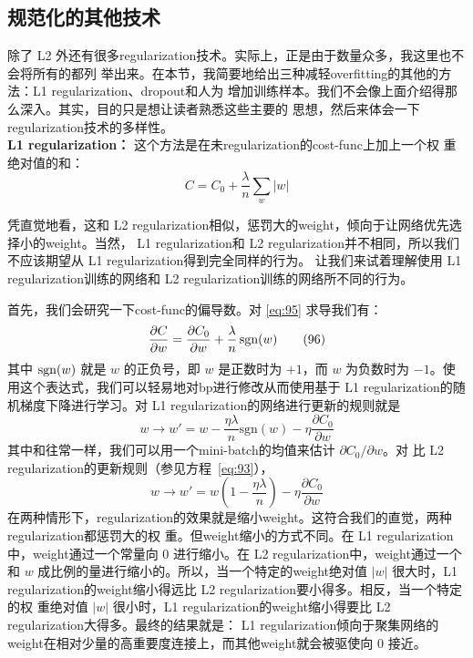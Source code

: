 \subsection{规范化的其他技术}

除了 L2 外还有很多\gls*{regularization}技术。实际上，正是由于数量众多，我这里也不会将所有的都列
举出来。在本节，我简要地给出三种减轻\gls*{overfitting}的其他的方法：L1 \gls*{regularization}、\gls*{dropout}和人为
增加训练样本。我们不会像上面介绍得那么深入。其实，目的只是想让读者熟悉这些主要的
思想，然后来体会一下\gls*{regularization}技术的多样性。\\

\textbf{L1 \gls*{regularization}：} 这个方法是在未\gls*{regularization}的\gls*{cost-func}上加上一个权
重绝对值的和：
\begin{equation}
  C = C_0 + \frac{\lambda}{n} \sum_w |w|
  \label{eq:95}\tag{95}
\end{equation}

凭直觉地看，这和 L2 \gls*{regularization}相似，惩罚大的\gls*{weight}，倾向于让网络优先选择小的\gls*{weight}。当然，
L1 \gls*{regularization}和 L2 \gls*{regularization}并不相同，所以我们不应该期望从 L1 \gls*{regularization}得到完全同样的行为。
让我们来试着理解使用 L1 \gls*{regularization}训练的网络和 L2 \gls*{regularization}训练的网络所不同的行为。

首先，我们会研究一下\gls*{cost-func}的偏导数。对 \eqref{eq:95} 求导我们有：
\begin{equation}
  \frac{\partial C}{\partial w} = \frac{\partial C_0}{\partial w}
  + \frac{\lambda}{n} \, {\rm sgn}(w)
  \label{eq:96}\tag{96}
\end{equation}
其中 ${\rm sgn}(w)$ 就是 $w$ 的正负号，即 $w$ 是正数时为 $+1$，而 $w$ 为负数时为
$-1$。使用这个表达式，我们可以轻易地对\gls*{bp}进行修改从而使用基于 L1 \gls*{regularization}的随
机梯度下降进行学习。对 L1 \gls*{regularization}的网络进行更新的规则就是
\begin{equation}
  w \rightarrow w' = w-\frac{\eta \lambda}{n} \mbox{sgn}(w) - \eta \frac{\partial
  C_0}{\partial w}
  \label{eq:97}\tag{97}
\end{equation}
其中和往常一样，我们可以用一个\gls*{mini-batch}的均值来估计 $\partial C_0/\partial w$。对
比 L2 \gls*{regularization}的更新规则（参见方程~\eqref{eq:93}），
\begin{equation}
  w \rightarrow w' = w\left(1 - \frac{\eta \lambda}{n} \right)
  - \eta \frac{\partial C_0}{\partial w}
  \label{eq:98}\tag{98}
\end{equation}
在两种情形下，\gls*{regularization}的效果就是缩小\gls*{weight}。这符合我们的直觉，两种\gls*{regularization}都惩罚大的权
重。但\gls*{weight}缩小的方式不同。在 L1 \gls*{regularization}中，\gls*{weight}通过一个常量向 $0$ 进行缩小。在 L2
\gls*{regularization}中，\gls*{weight}通过一个和 $w$ 成比例的量进行缩小的。所以，当一个特定的\gls*{weight}绝对值
$|w|$ 很大时，L1 \gls*{regularization}的\gls*{weight}缩小得远比 L2 \gls*{regularization}要小得多。相反，当一个特定的权
重绝对值 $|w|$ 很小时，L1 \gls*{regularization}的\gls*{weight}缩小得要比 L2 \gls*{regularization}大得多。最终的结果就是：
L1 \gls*{regularization}倾向于聚集网络的\gls*{weight}在相对少量的高重要度连接上，而其他\gls*{weight}就会被驱使向
$0$ 接近。

